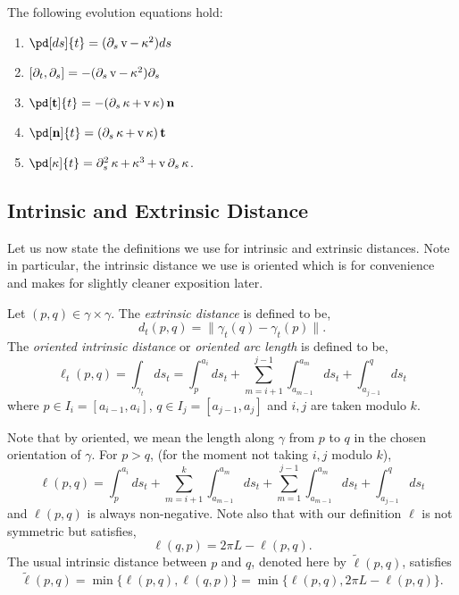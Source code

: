 \documentclass[12pt]{amsart}
\begin{document}
\begin{lemma}
\label{lem:basic_evolution}
The following evolution equations hold:
\begin{enumerate}
\item \(\pd[ds]{t} = (\partial_s \tangspeed - \curvecurv^2) ds\)
\item \([\partial_t, \partial_s] = -(\partial_s \operatorname{v} - \operatorname{\kappa}^2) \partial_s\)
\item \(\pd[\tang]{t} = -(\partial_s \curvecurv + \tangspeed\curvecurv) \nor\)
\item \(\pd[\nor]{t} = (\partial_s \curvecurv + \tangspeed\curvecurv) \tang\)
\item \(\pd[\curvecurv]{t} = \partial_s^2 \curvecurv + \curvecurv^3 + \tangspeed \partial_s \curvecurv\).
\end{enumerate}
\end{lemma}

\subsection{Intrinsic and Extrinsic Distance}
\label{subsec:dl}

Let us now state the definitions we use for intrinsic and extrinsic distances. Note in particular, the intrinsic distance we use is oriented which is for convenience and makes for slightly cleaner exposition later.

\begin{defn}
\label{defn:dist}
Let \((p,q) \in \gamma \times \gamma\). The \emph{extrinsic distance} is defined to be,
\[
d_t(p, q) = \|\gamma_t(q) - \gamma_t(p)\|.
\]
The \emph{oriented intrinsic distance} or \emph{oriented arc length} is defined to be,
\[
\ell_t(p, q) = \int_{\gamma_t} ds_t = \int_p^{a_i} ds_t + \sum_{m=i+1}^{j-1} \int_{a_{m-1}}^{a_m} ds_t + \int_{a_{j-1}}^q ds_t
\]
where \(p \in I_i = [a_{i-1}, a_i]\), \(q \in I_j = [a_{j-1}, a_j]\) and \(i,j\) are taken modulo \(k\).
\end{defn}

Note that by oriented, we mean the length along \(\gamma\) from \(p\) to \(q\) in the chosen orientation of \(\gamma\). For \(p > q\), (for the moment not taking \(i,j\) modulo \(k\)),
\[
\ell(p, q) = \int_p^{a_i} ds_t + \sum_{m=i+1}^{k} \int_{a_{m-1}}^{a_m} ds_t + \sum_{m=1}^{j-1} \int_{a_{m-1}}^{a_m} ds_t + \int_{a_{j-1}}^q ds_t
\]
and \(\ell(p, q)\) is always non-negative. Note also that with our definition \(\ell\) is not symmetric but satisfies,
\begin{equation}
\label{eq:ell_symmetry}
\ell(q, p) = 2\pi L - \ell(p, q).
\end{equation}
The usual intrinsic distance between \(p\) and \(q\), denoted here by \(\tilde{\ell}(p, q)\), satisfies
\[
\tilde{\ell}(p, q) = \min\{\ell(p, q), \ell(q, p)\} = \min\{\ell(p, q), 2\pi L - \ell(p, q)\}.
\]
\end{document}
